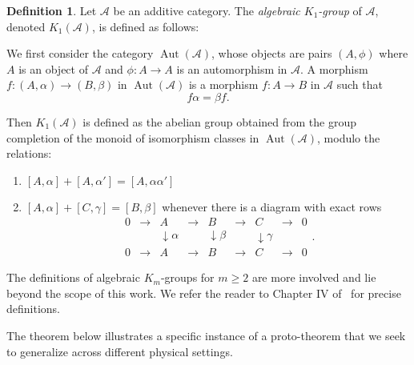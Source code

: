 \documentclass{article}
\theoremstyle{definition}
\newtheorem{defn}[theorem]{Definition}
\begin{document}
\begin{defn}
Let $\mathcal{A}$ be an additive category. The \emph{algebraic \(K_1\)-group} of $\mathcal{A}$, denoted \(K_1(\mathcal{A})\), is defined as follows:

\medskip

We first consider the category $\operatorname{Aut}(\mathcal{A})$, whose objects are pairs \((A, \phi)\) where \(A\) is an object of \(\mathcal{A}\) and \(\phi : A \to A\) is an automorphism in \(\mathcal{A}\). A morphism \(f : (A, \alpha) \to (B, \beta)\) in \(\operatorname{Aut}(\mathcal{A})\) is a morphism \(f : A \to B\) in \(\mathcal{A}\) such that
\[
f   \alpha = \beta   f.
\]

Then \(K_1(\mathcal{A})\) is defined as the abelian group obtained from the group completion of the monoid of isomorphism classes in \(\operatorname{Aut}(\mathcal{A})\), modulo the relations:
\begin{enumerate}
    \item $[A, \alpha]+ [A, \alpha']= [A, \alpha  \alpha']$
    \item $[A, \alpha]+[C, \gamma]= [B, \beta]$ whenever there is a diagram with exact rows
    \[
\begin{array}{ccccccccc}
0 & \longrightarrow & A & \longrightarrow & B & \longrightarrow & C & \longrightarrow & 0 \\
  &                 & \downarrow{\scriptstyle \alpha} 
  &                 & \downarrow{\scriptstyle \beta} 
  &                 & \downarrow{\scriptstyle \gamma} 
  &                 &   \\
0 & \longrightarrow & A & \longrightarrow & B & \longrightarrow & C & \longrightarrow & 0
\end{array}.
\]

\end{enumerate}


\end{defn}

The definitions of algebraic $K_m$-groups for $m \geq 2$ are more involved and lie beyond the scope of this work. We refer the reader to Chapter IV of~\cite{weibel2013k} for precise definitions. %

The theorem below illustrates a specific instance of a proto-theorem that we seek to generalize across different physical settings.
\end{document}
